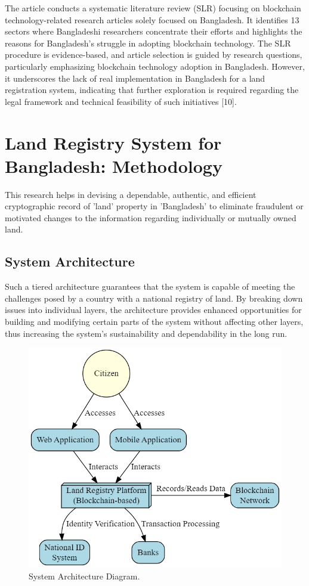 \documentclass[conference]{IEEEtran}
\begin{document}
The article conducts a systematic literature review (SLR) focusing on blockchain technology-related research articles solely focused on Bangladesh. It identifies 13 sectors where Bangladeshi researchers concentrate their efforts and highlights the reasons for Bangladesh's struggle in adopting blockchain technology. The SLR procedure is evidence-based, and article selection is guided by research questions, particularly emphasizing blockchain technology adoption in Bangladesh. However, it underscores the lack of real implementation in Bangladesh for a land registration system, indicating that further exploration is required regarding the legal framework and technical feasibility of such initiatives [10].

\section{Land Registry System for Bangladesh: Methodology}
This research helps in devising a dependable, authentic, and efficient cryptographic record of 'land' property in 'Bangladesh' to eliminate fraudulent or motivated changes to the information regarding individually or mutually owned land.

\subsection{System Architecture}
Such a tiered architecture guarantees that the system is capable of meeting the challenges posed by a country with a national registry of land. By breaking down issues into individual layers, the architecture provides enhanced opportunities for building and modifying certain parts of the system without affecting other layers, thus increasing the system's sustainability and dependability in the long run.

\begin{figure}[H]
    \centerline{\includegraphics[width=0.8\linewidth]{fig1.png}}
    \caption{System Architecture Diagram.}
    \label{fig1}
\end{figure}
\end{document}
